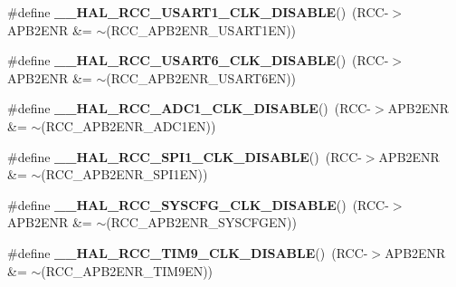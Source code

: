 \begin{DoxyCompactItemize}
\item 
\#define {\bfseries \+\_\+\+\_\+\+H\+A\+L\+\_\+\+R\+C\+C\+\_\+\+U\+S\+A\+R\+T1\+\_\+\+C\+L\+K\+\_\+\+D\+I\+S\+A\+B\+LE}()~(R\+CC-\/$>$A\+P\+B2\+E\+NR \&= $\sim$(R\+C\+C\+\_\+\+A\+P\+B2\+E\+N\+R\+\_\+\+U\+S\+A\+R\+T1\+EN))\hypertarget{group___r_c_c___a_p_b2___clock___enable___disable_gae0050944298552e9f02f56ec8634f5a6}{}\label{group___r_c_c___a_p_b2___clock___enable___disable_gae0050944298552e9f02f56ec8634f5a6}

\item 
\#define {\bfseries \+\_\+\+\_\+\+H\+A\+L\+\_\+\+R\+C\+C\+\_\+\+U\+S\+A\+R\+T6\+\_\+\+C\+L\+K\+\_\+\+D\+I\+S\+A\+B\+LE}()~(R\+CC-\/$>$A\+P\+B2\+E\+NR \&= $\sim$(R\+C\+C\+\_\+\+A\+P\+B2\+E\+N\+R\+\_\+\+U\+S\+A\+R\+T6\+EN))\hypertarget{group___r_c_c___a_p_b2___clock___enable___disable_gac4b142412ef1e3dab8dcf5d5f7ca4d92}{}\label{group___r_c_c___a_p_b2___clock___enable___disable_gac4b142412ef1e3dab8dcf5d5f7ca4d92}

\item 
\#define {\bfseries \+\_\+\+\_\+\+H\+A\+L\+\_\+\+R\+C\+C\+\_\+\+A\+D\+C1\+\_\+\+C\+L\+K\+\_\+\+D\+I\+S\+A\+B\+LE}()~(R\+CC-\/$>$A\+P\+B2\+E\+NR \&= $\sim$(R\+C\+C\+\_\+\+A\+P\+B2\+E\+N\+R\+\_\+\+A\+D\+C1\+EN))\hypertarget{group___r_c_c___a_p_b2___clock___enable___disable_ga80a9e4852bac07d3d9cc6390a361302a}{}\label{group___r_c_c___a_p_b2___clock___enable___disable_ga80a9e4852bac07d3d9cc6390a361302a}

\item 
\#define {\bfseries \+\_\+\+\_\+\+H\+A\+L\+\_\+\+R\+C\+C\+\_\+\+S\+P\+I1\+\_\+\+C\+L\+K\+\_\+\+D\+I\+S\+A\+B\+LE}()~(R\+CC-\/$>$A\+P\+B2\+E\+NR \&= $\sim$(R\+C\+C\+\_\+\+A\+P\+B2\+E\+N\+R\+\_\+\+S\+P\+I1\+EN))\hypertarget{group___r_c_c___a_p_b2___clock___enable___disable_gaf2ccb5c6b63a60deb6463cbc629c10fe}{}\label{group___r_c_c___a_p_b2___clock___enable___disable_gaf2ccb5c6b63a60deb6463cbc629c10fe}

\item 
\#define {\bfseries \+\_\+\+\_\+\+H\+A\+L\+\_\+\+R\+C\+C\+\_\+\+S\+Y\+S\+C\+F\+G\+\_\+\+C\+L\+K\+\_\+\+D\+I\+S\+A\+B\+LE}()~(R\+CC-\/$>$A\+P\+B2\+E\+NR \&= $\sim$(R\+C\+C\+\_\+\+A\+P\+B2\+E\+N\+R\+\_\+\+S\+Y\+S\+C\+F\+G\+EN))\hypertarget{group___r_c_c___a_p_b2___clock___enable___disable_gaf04a5f1f0d6d8577706022a866f4528e}{}\label{group___r_c_c___a_p_b2___clock___enable___disable_gaf04a5f1f0d6d8577706022a866f4528e}

\item 
\#define {\bfseries \+\_\+\+\_\+\+H\+A\+L\+\_\+\+R\+C\+C\+\_\+\+T\+I\+M9\+\_\+\+C\+L\+K\+\_\+\+D\+I\+S\+A\+B\+LE}()~(R\+CC-\/$>$A\+P\+B2\+E\+NR \&= $\sim$(R\+C\+C\+\_\+\+A\+P\+B2\+E\+N\+R\+\_\+\+T\+I\+M9\+EN))\hypertarget{group___r_c_c___a_p_b2___clock___enable___disable_ga6c858a3c7df429051fe4459a8a22da43}{}\label{group___r_c_c___a_p_b2___clock___enable___disable_ga6c858a3c7df429051fe4459a8a22da43}


\end{DoxyCompactItemize}
